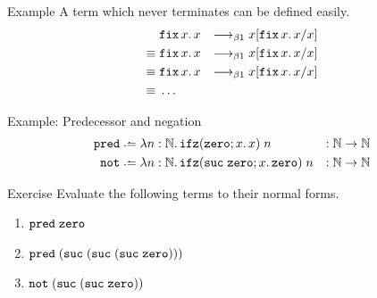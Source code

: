 \begin{frame}{Example}
  A term which never terminates can be defined easily.
  \begin{align*}
             & \mathtt{fix}\,x.\,x & \longrightarrow_{\beta1} x[{\mathtt{fix}\,x.\,x}/{x}] \\
    \equiv{} & \mathtt{fix}\,x.\,x & \longrightarrow_{\beta1} x[{\mathtt{fix}\,x.\,x}/{x}] \\
    \equiv{} & \mathtt{fix}\,x.\,x & \longrightarrow_{\beta1} x[{\mathtt{fix}\,x.\,x}/{x}] \\
    \equiv{} & \dots
  \end{align*}
\end{frame}

\begin{frame}{Example: Predecessor and negation}
  \begin{align*}
    \pred & \defeq \lambda n : \mathbb{N}.\,\ifz(\zero; x.\, x)\;n & : \mathbb{N} \to \mathbb{N} \\
               \mathtt{not} & \defeq \lambda n : \mathbb{N}.\, \ifz(\suc\;\zero; x.\, \zero)\; n & : \mathbb{N} \to \mathbb{N}
  \end{align*}
  \begin{block}{Exercise}
    Evaluate the following terms to their normal forms.
    \begin{enumerate}
      \item $\mathtt{pred}\;\mathtt{zero}$
      \item $\mathtt{pred}\;(\mathtt{suc}\;(\mathtt{suc}\;(\mathtt{suc}\;\mathtt{zero})))$
      \item $\mathtt{not}\;(\mathtt{suc}\;(\mathtt{suc}\;\mathtt{zero}))$
    \end{enumerate}
    
  \end{block}
\end{frame}

